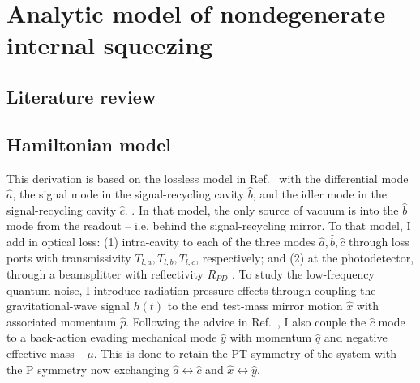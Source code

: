 \chapter{Analytic model of nondegenerate internal squeezing} %
\label{chp:nIS_analytics}






\section{Literature review}




\section{Hamiltonian model}

This derivation is based on the lossless model in Ref.~\cite{liBroadbandSensitivityImprovement2020} with the differential mode $\hat{a}$, the signal mode in the signal-recycling cavity $\hat{b}$, and the idler mode in the signal-recycling cavity $\hat{c}$. . In that model, the only source of vacuum is into the $\hat{b}$ mode from the readout -- i.e. behind the signal-recycling mirror.
To that model, I add in optical loss: (1) intra-cavity to each of the three modes $\hat{a}, \hat{b}, \hat{c}$ through loss ports  with transmissivity $T_{l,a}, T_{l,b}, T_{l,c}$, respectively; and (2) at the photodetector, through a beamsplitter with reflectivity $R_{PD}$ .
To study the low-frequency quantum noise, I introduce radiation pressure effects through coupling the gravitational-wave signal $h(t)$ to the end test-mass mirror motion $\hat{x}$ with associated momentum $\hat{p}$.
Following the advice  in Ref.~\cite{liBroadbandSensitivityImprovement2020}, I also couple the $\hat{c}$ mode to a back-action evading mechanical mode $\hat{y}$ with momentum $\hat{q}$ and negative effective mass $-\mu$. This is done to retain the PT-symmetry of the system with the P symmetry now exchanging $\hat{a}\leftrightarrow\hat{c}$ and $\hat{x}\leftrightarrow\hat{y}$.


